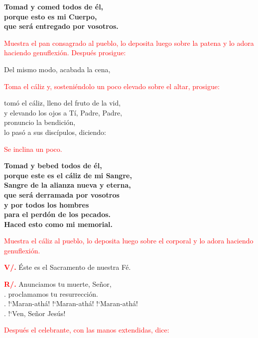 \documentclass[12pt, letterpaper]{report}
\begin{document}
\noindent
\LARGE{\bfseries{Tomad y comed todos de \'el,\\
porque esto es mi Cuerpo,\\
que ser\'a entregado por vosotros.}}

\large{\textcolor{red}{Muestra el pan consagrado al pueblo, lo deposita luego sobre la patena y lo adora haciendo genuflexi\'on. Despu\'es prosigue:}}

\noindent
\Large Del mismo modo, acabada la cena,

\large{\textcolor{red}{Toma el c\'aliz y, sosteni\'endolo un poco elevado sobre el altar, prosigue:}}

\noindent
\Large tom\'o el c\'aliz, lleno del fruto de la vid,\\
y elevando los ojos a T\'i, Padre, Padre,\\
pronuncio la bendici\'on,\\
lo pas\'o a sus disc\'ipulos, diciendo:

\large{\textcolor{red}{Se inclina un poco.}}

\noindent
\LARGE{\bfseries{Tomad y bebed todos de \'el,\\
porque este es el c\'aliz de mi Sangre,\\
Sangre de la alianza nueva y eterna,\\
que ser\'a derramada por vosotros\\ 
y por todos los hombres\\
para el perd\'on de los pecados.\\
Haced esto como mi memorial.}}

\large{\textcolor{red}{Muestra el c\'aliz al pueblo, lo deposita luego sobre el corporal y lo adora haciendo genuflexi\'on.}}

\noindent
\Large {\bfseries \textcolor{red}{V/.}} \hspace{0.5cm} \'Este es el Sacramento de nuestra F\'e.

\noindent
\Large {\bfseries \textcolor{red}{R/.}} \hspace{0.5cm} Anunciamos tu muerte, Se\~nor,\\
. \hspace{1.5cm} proclamamos tu resurrecci\'on.\\
. \hspace{1.5cm} !`Maran-ath\'a! !`Maran-ath\'a! !`Maran-ath\'a!\\
. \hspace{1.5cm} !`Ven, Se\~nor Jes\'us!

\large{\textcolor{red}{Despu\'es el celebrante, con las manos extendidas, dice:}} 
\end{document}
